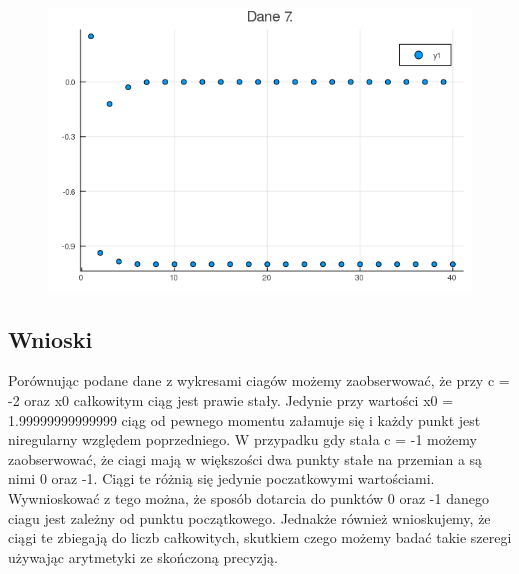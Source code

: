 \documentclass{article}
\begin{document}
\begin{figure}[h]
\begin{minipage}{0.40\textwidth}
  \end{minipage}
  \begin{minipage}{0.40\textwidth}
    \centering
    \includegraphics[width=\linewidth]{plot7}
  \end{minipage}
\end{figure}

\subsection{Wnioski}
Porównując podane dane z wykresami ciagów możemy zaobserwować, że przy c = -2 oraz x0 całkowitym ciąg jest prawie stały. Jedynie przy wartości x0 = 1.99999999999999 ciąg od pewnego momentu załamuje się i każdy punkt jest niregularny względem poprzedniego. W przypadku gdy stała c = -1 możemy zaobserwować, że ciagi mają w większości dwa punkty stałe na przemian a są nimi 0 oraz -1. Ciągi te różnią się jedynie poczatkowymi wartościami. Wywnioskować z tego można, że sposób dotarcia do punktów 0 oraz -1 danego ciagu jest zależny od punktu początkowego. Jednakże również wnioskujemy, że ciągi te zbiegają do liczb całkowitych, skutkiem czego możemy badać takie szeregi używając arytmetyki ze skończoną precyzją.
\end{document}
